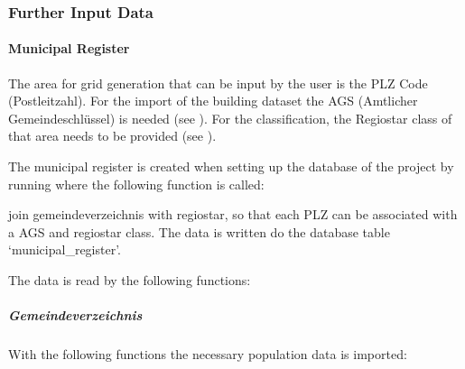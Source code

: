 \documentclass[letterpaper,10pt,english]{sphinxmanual}
\begin{document}
\subsubsection{Further Input Data}
\label{\detokenize{docs_pylovo/installation:further-input-data}}
\sphinxstepscope


\paragraph{Municipal Register}
\label{\detokenize{docs_pylovo/municipal_register/municipal_register:municipal-register}}\label{\detokenize{docs_pylovo/municipal_register/municipal_register::doc}}
\sphinxAtStartPar
The area for grid generation that can be input by the user is the PLZ Code (Postleitzahl). For the import of the building
dataset the AGS (Amtlicher Gemeindeschlüssel) is needed (see {\hyperref[\detokenize{grid_generation/index::doc}]{}}).
For the classification, the Regiostar class of that area needs to be provided (see {\hyperref[\detokenize{classification/index::doc}]{}}).

\sphinxAtStartPar
The municipal register is created when setting up the database of the project by running 
where the following function is called:

\begin{fulllineitems}
\label{\detokenize{docs_pylovo/municipal_register/municipal_register:municipal_register.join_regiostar_gemeindeverz.create_municipal_register}}
\pysigstartsignatures
{}
\pysigstopsignatures
\sphinxAtStartPar
join gemeindeverzeichnis with regiostar, so that each PLZ can be associated with a AGS and regiostar class.
The data is written do the database table ‘municipal\_register’.

\end{fulllineitems}


\sphinxAtStartPar
The data is read by the following functions:


\subparagraph{Gemeindeverzeichnis}
\label{\detokenize{docs_pylovo/municipal_register/municipal_register:gemeindeverzeichnis}}
\sphinxAtStartPar
With the following functions the necessary population data is imported:
\end{document}

